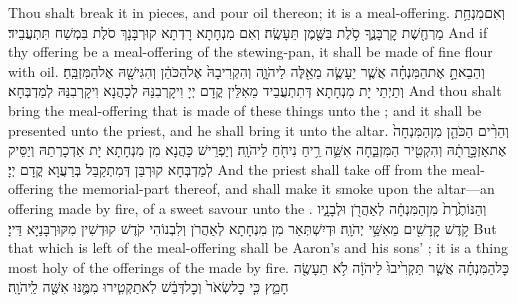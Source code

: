 {Thou shalt break it in pieces, and pour oil thereon; it is a meal-offering.}{}
{וְאִם\maqqaf מִנְחַ֥ת מַרְחֶ֖שֶׁת קׇרְבָּנֶ֑ךָ סֹ֥לֶת בַּשֶּׁ֖מֶן תֵּעָשֶֽׂה׃}
{וְאִם מִנְחָתָא רָדְתָא קוּרְבָּנָךְ סֹלֶת בִּמְשַׁח תִּתְעֲבֵיד׃}
{And if thy offering be a meal-offering of the stewing-pan, it shall be made of fine flour with oil.}{}
{וְהֵבֵאתָ֣ אֶת\maqqaf הַמִּנְחָ֗ה אֲשֶׁ֧ר יֵעָשֶׂ֛ה מֵאֵ֖לֶּה לַיהֹוָ֑ה וְהִקְרִיבָהּ֙ אֶל\maqqaf הַכֹּהֵ֔ן וְהִגִּישָׁ֖הּ אֶל\maqqaf הַמִּזְבֵּֽחַ׃}
{וְתַיְתֵי יָת מִנְחָתָא דְּתִתְעֲבֵיד מֵאִלֵּין קֳדָם יְיָ וִיקָרְבִנַּהּ לְכָהֲנָא וִיקָרְבִנַּהּ לְמַדְבְּחָא׃}
{And thou shalt bring the meal-offering that is made of these things unto the \lord; and it shall be presented unto the priest, and he shall bring it unto the altar.}{}
{וְהֵרִ֨ים הַכֹּהֵ֤ן מִן\maqqaf הַמִּנְחָה֙ אֶת\maqqaf אַזְכָּ֣רָתָ֔הּ וְהִקְטִ֖יר הַמִּזְבֵּ֑חָה אִשֵּׁ֛ה רֵ֥יחַ נִיחֹ֖חַ לַיהֹוָֽה׃}
{וְיַפְרֵישׁ כָּהֲנָא מִן מִנְחָתָא יָת אַדְכָרְתַהּ וְיַסֵּיק לְמַדְבְּחָא קוּרְבַּן דְּמִתְקַבַּל בְּרַעֲוָא קֳדָם יְיָ׃}
{And the priest shall take off from the meal-offering the memorial-part thereof, and shall make it smoke upon the altar—an offering made by fire, of a sweet savour unto the \lord.}{}
{וְהַנּוֹתֶ֙רֶת֙ מִן\maqqaf הַמִּנְחָ֔ה לְאַהֲרֹ֖ן וּלְבָנָ֑יו קֹ֥דֶשׁ קׇֽדָשִׁ֖ים מֵאִשֵּׁ֥י יְהֹוָֽה׃}
{וּדְיִשְׁתְּאַר מִן מִנְחָתָא לְאַהֲרֹן וְלִבְנוֹהִי קֹדֶשׁ קוּדְשִׁין מִקּוּרְבָּנַיָּא דַּייָ׃}
{But that which is left of the meal-offering shall be Aaron’s and his sons’ ; it is a thing most holy of the offerings of the \lord\space made by fire.}{}
{כׇּל\maqqaf הַמִּנְחָ֗ה אֲשֶׁ֤ר תַּקְרִ֙יבוּ֙ לַיהֹוָ֔ה לֹ֥א תֵעָשֶׂ֖ה חָמֵ֑ץ כִּ֤י כׇל\maqqaf שְׂאֹר֙ וְכׇל\maqqaf דְּבַ֔שׁ לֹֽא\maqqaf תַקְטִ֧ירוּ מִמֶּ֛נּוּ אִשֶּׁ֖ה לַֽיהֹוָֽה׃}
